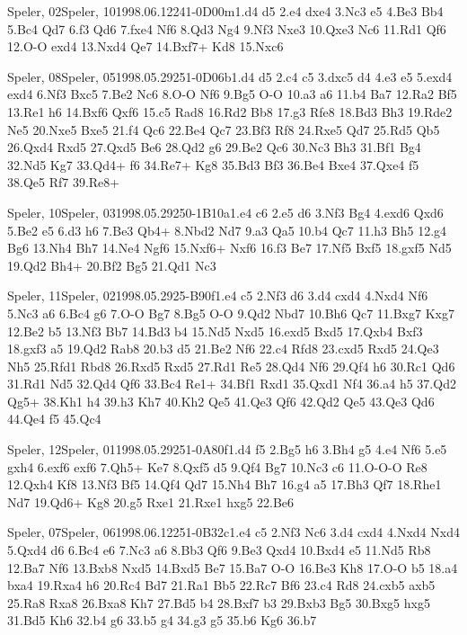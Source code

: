 \documentclass[twocolumn,a4paper,10pt]{report}
\begin{document}
\begin{chessgame}{Speler, 02}{Speler, 10}{1998.06.12}{24}{1-0}{D00m}{1.d4 d5 2.e4 dxe4 3.Nc3 e5 4.Be3 Bb4 5.Bc4 Qd7 6.f3 Qd6 7.fxe4 Nf6 8.Qd3 Ng4 9.Nf3 Nxe3 10.Qxe3 Nc6 11.Rd1 Qf6 12.O-O exd4 13.Nxd4 Qe7 14.Bxf7+ Kd8 15.Nxc6\mate}\end{chessgame}
\begin{chessgame}{Speler, 08}{Speler, 05}{1998.05.29}{25}{1-0}{D06b}{1.d4 d5 2.c4 c5 3.dxc5 d4 4.e3 e5 5.exd4 exd4 6.Nf3 Bxc5 7.Be2 Nc6 8.O-O Nf6 9.Bg5 O-O 10.a3 a6 11.b4 Ba7 12.Ra2 Bf5 13.Re1 h6 14.Bxf6 Qxf6 15.c5 Rad8 16.Rd2 Bb8 17.g3 Rfe8 18.Bd3 Bh3 19.Rde2 Ne5 20.Nxe5 Bxe5 21.f4 Qc6 22.Be4 Qc7 23.Bf3 Rf8 24.Rxe5 Qd7 25.Rd5 Qb5 26.Qxd4 Rxd5 27.Qxd5 Be6 28.Qd2 g6 29.Be2 Qc6 30.Nc3 Bh3 31.Bf1 Bg4 32.Nd5 Kg7 33.Qd4+ f6 34.Re7+ Kg8 35.Bd3 Bf3 36.Be4 Bxe4 37.Qxe4 f5 38.Qe5 Rf7 39.Re8+}\end{chessgame}
\begin{chessgame}{Speler, 10}{Speler, 03}{1998.05.29}{25}{0-1}{B10a}{1.e4 c6 2.e5 d6 3.Nf3 Bg4 4.exd6 Qxd6 5.Be2 e5 6.d3 h6 7.Be3 Qb4+ 8.Nbd2 Nd7 9.a3 Qa5 10.b4 Qc7 11.h3 Bh5 12.g4 Bg6 13.Nh4 Bh7 14.Ne4 Ngf6 15.Nxf6+ Nxf6 16.f3 Be7 17.Nf5 Bxf5 18.gxf5 Nd5 19.Qd2 Bh4+ 20.Bf2 Bg5 21.Qd1 Nc3}\end{chessgame}
\begin{chessgame}{Speler, 11}{Speler, 02}{1998.05.29}{25}{\textonehalf-\textonehalf}{B90f}{1.e4 c5 2.Nf3 d6 3.d4 cxd4 4.Nxd4 Nf6 5.Nc3 a6 6.Bc4 g6 7.O-O Bg7 8.Bg5 O-O 9.Qd2 Nbd7 10.Bh6 Qc7 11.Bxg7 Kxg7 12.Be2 b5 13.Nf3 Bb7 14.Bd3 b4 15.Nd5 Nxd5 16.exd5 Bxd5 17.Qxb4 Bxf3 18.gxf3 a5 19.Qd2 Rab8 20.b3 d5 21.Be2 Nf6 22.c4 Rfd8 23.cxd5 Rxd5 24.Qe3 Nh5 25.Rfd1 Rbd8 26.Rxd5 Rxd5 27.Rd1 Re5 28.Qd4 Nf6 29.Qf4 h6 30.Rc1 Qd6 31.Rd1 Nd5 32.Qd4 Qf6 33.Bc4 Re1+ 34.Bf1 Rxd1 35.Qxd1 Nf4 36.a4 h5 37.Qd2 Qg5+ 38.Kh1 h4 39.h3 Kh7 40.Kh2 Qe5 41.Qe3 Qf6 42.Qd2 Qe5 43.Qe3 Qd6 44.Qe4 f5 45.Qc4}\end{chessgame}
\begin{chessgame}{Speler, 12}{Speler, 01}{1998.05.29}{25}{1-0}{A80f}{1.d4 f5 2.Bg5 h6 3.Bh4 g5 4.e4 Nf6 5.e5 gxh4 6.exf6 exf6 7.Qh5+ Ke7 8.Qxf5 d5 9.Qf4 Bg7 10.Nc3 c6 11.O-O-O Re8 12.Qxh4 Kf8 13.Nf3 Bf5 14.Qf4 Qd7 15.Nh4 Bh7 16.g4 a5 17.Bh3 Qf7 18.Rhe1 Nd7 19.Qd6+ Kg8 20.g5 Rxe1 21.Rxe1 hxg5 22.Be6}\end{chessgame}
\begin{chessgame}{Speler, 07}{Speler, 06}{1998.06.12}{25}{1-0}{B32c}{1.e4 c5 2.Nf3 Nc6 3.d4 cxd4 4.Nxd4 Nxd4 5.Qxd4 d6 6.Bc4 e6 7.Nc3 a6 8.Bb3 Qf6 9.Be3 Qxd4 10.Bxd4 e5 11.Nd5 Rb8 12.Ba7 Nf6 13.Bxb8 Nxd5 14.Bxd5 Be7 15.Ba7 O-O 16.Be3 Kh8 17.O-O b5 18.a4 bxa4 19.Rxa4 h6 20.Rc4 Bd7 21.Ra1 Bb5 22.Rc7 Bf6 23.c4 Rd8 24.cxb5 axb5 25.Ra8 Rxa8 26.Bxa8 Kh7 27.Bd5 b4 28.Bxf7 b3 29.Bxb3 Bg5 30.Bxg5 hxg5 31.Bd5 Kh6 32.b4 g6 33.b5 g4 34.g3 g5 35.b6 Kg6 36.b7}\end{chessgame}
\end{document}
